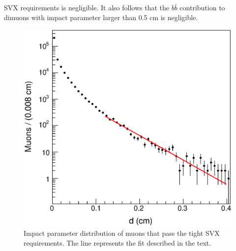 \documentclass[aps,prd,preprint,floatfix,nofootinbib,superscriptaddress,showpacs,amssymb]{revtex4}
\begin{document}
 SVX requirements is negligible. It also follows that the $b\bar{b}$
 contribution to dimuons with impact parameter larger than 0.5 cm is
 negligible.
 \begin{figure}[]
 \begin{center}
 \vspace{-0.2in}
 \leavevmode
 \includegraphics*[width=\textwidth]{fa0_4_new.eps}
 \caption[] {Impact parameter distribution of muons that pass the tight
             SVX requirements. The line represents the fit described in 
             the text.}
 \label{fig:fig_4}
 \end{center}
 \end{figure}
\end{document}
